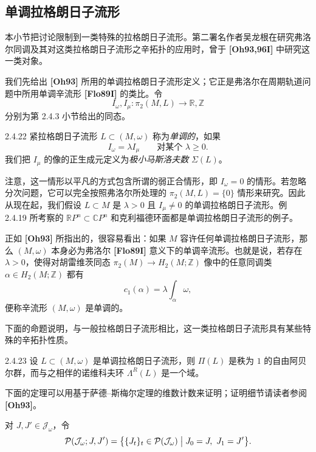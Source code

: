 
\subsection{单调拉格朗日子流形}
\label{sec:2-4-4}

本小节把讨论限制到一类特殊的拉格朗日子流形。第二署名作者吴龙根在研究弗洛尔同调及其对这类拉格朗日子流形之辛拓扑的应用时，曾于 \textbf{[Oh93,96I]} 中研究这一类对象。

我们先给出 \textbf{[Oh93]} 所用的单调拉格朗日子流形定义；它正是弗洛尔在周期轨道问题中所用单调辛流形 \textbf{[Flo89I]} 的类比。令
\[
  I_\omega,I_\mu:\pi_2(M,L)\longrightarrow\mathbb R,\mathbb Z
\]
分别为第 2.4.3 小节给出的同态。

\begin{definition}{2.4.22}\label{def:2-4-22}
紧拉格朗日子流形 $L\subset(M,\omega)$ 称为\emph{单调的}，如果
\[
  I_\omega=\lambda I_\mu
  \qquad\text{对某个 }\lambda\geq0.
\]
我们把 $I_\mu$ 的像的正生成元定义为\emph{极小马斯洛夫数} $\Sigma(L)$。
\end{definition}

注意，这一情形以平凡的方式包含所谓的弱正合情形，即 $I_\omega=0$ 的情形。若忽略分次问题，它可以完全按照弗洛尔所处理的 $\pi_2(M,L)=\{0\}$ 情形来研究。因此从现在起，我们假设 $L\subset M$ 是 $\lambda>0$ 且 $I_\mu\neq0$ 的单调拉格朗日子流形。例 2.4.19 所考察的 $\mathbb RP^n\subset\mathbb CP^n$ 和克利福德环面都是单调拉格朗日子流形的例子。

正如 \textbf{[Oh93]} 所指出的，很容易看出：如果 $M$ 容许任何单调拉格朗日子流形，那么 $(M,\omega)$ 本身必为弗洛尔 \textbf{[Flo89I]} 意义下的单调辛流形。也就是说，若存在 $\lambda>0$，使得对胡雷维茨同态
$\pi_2(M)\to H_2(M;\mathbb Z)$ 像中的任意同调类 $\alpha\in H_2(M;\mathbb Z)$ 都有
\[
  c_1(\alpha)=\lambda\int_\alpha\omega,
\]
便称辛流形 $(M,\omega)$ 是单调的。

下面的命题说明，与一般拉格朗日子流形相比，这一类拉格朗日子流形具有某些特殊的辛拓扑性质。

\begin{proposition}{2.4.23}\label{prop:2-4-23}
设 $L\subset(M,\omega)$ 是单调拉格朗日子流形，则 $\Pi(L)$ 是秩为 $1$ 的自由阿贝尔群，而与之相伴的诺维科夫环 $\Lambda^R(L)$ 是一个域。
\end{proposition}

下面的定理可以用基于萨德--斯梅尔定理的维数计数来证明；证明细节请读者参阅 \textbf{[Oh93]}。

对 $J,J'\in\mathcal J_\omega$，令
\[
  \mathcal P(\mathcal J_\omega;J,J')
  =\bigl\{\{J_t\}_t\in\mathcal P(\mathcal J_\omega)
    \bigm|J_0=J,\ J_1=J'\bigr\}.
\]

